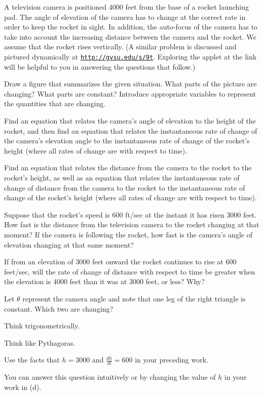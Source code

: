 \begin{activity} \label{A:3.1.2}  A television camera is positioned $4000$ feet from the base of a rocket launching pad.  The angle of elevation of the camera has to change at the correct rate in order to keep the rocket in sight.  In addition, the auto-focus of the camera has to take into account the increasing distance between the camera and the rocket.  We assume that the rocket rises vertically.  (A similar problem is discussed and pictured dynamically at \href{http://gvsu.edu/s/9t}{\texttt{http://gvsu.edu/s/9t}}.  Exploring the applet at the link will be helpful to you in answering the questions that follow.)
\ba
	\item Draw a figure that summarizes the given situation.  What parts of the picture are changing?  What parts are constant?  Introduce appropriate variables to represent the quantities that are changing.
	\item Find an equation that relates the camera's angle of elevation to the height of the rocket, and then find an equation that relates the instantaneous rate of change of the camera's elevation angle to the instantaneous rate of change of the rocket's height (where all rates of change are with respect to time).
	\item Find an equation that relates the distance from the camera to the rocket to the rocket's height, as well as an equation that relates the instantaneous rate of change of distance from the camera to the rocket to the instantaneous rate of change of the rocket's height (where all rates of change are with respect to time).
	\item Suppose that the rocket's speed is $600$ ft/sec at the instant it has risen $3000$ feet.  How fast is the distance from the television camera to the rocket changing at that moment?  If the camera is following the rocket, how fast is the camera's angle of elevation changing at that same moment?
	\item If from an elevation of $3000$ feet onward the rocket continues to rise at $600$ feet/sec, will the rate of change of distance with respect to time be greater when the elevation is $4000$ feet than it was at $3000$ feet, or less?  Why?  
\ea
\end{activity}
\begin{smallhint}
\ba
	\item Let $\theta$ represent the camera angle and note that one leg of the right triangle is constant.  Which two are changing?
	\item Think trigonometrically.
	\item Think like Pythagoras.
	\item Use the facts that $h = 3000$ and $\frac{dh}{dt} = 600$ in your preceding work.
	\item You can answer this question intuitively or by changing the value of $h$ in your work in (d).
\ea
\end{smallhint}
